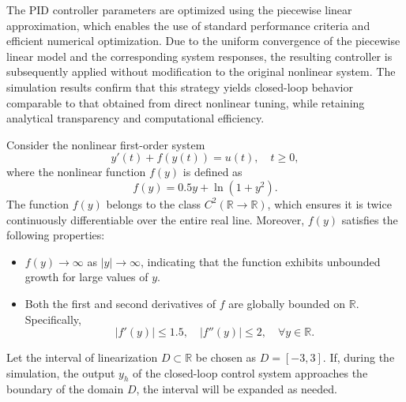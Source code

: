 \documentclass[preprint,12pt]{elsarticle}
\begin{document}
The PID controller parameters are optimized using the piecewise linear approximation, which enables the use of standard performance criteria and efficient numerical optimization. Due to the uniform convergence of the piecewise linear model and the corresponding system responses, the resulting controller is subsequently applied without modification to the original nonlinear system. The simulation results confirm that this strategy yields closed-loop behavior comparable to that obtained from direct nonlinear tuning, while retaining analytical transparency and computational efficiency.

Consider the nonlinear first-order system  
\begin{equation*}
y'(t) + f(y(t)) = u(t), \quad t \geq 0,
\end{equation*}
where the nonlinear function \( f(y) \) is defined as  
\begin{equation*}
f(y) = 0.5y + \ln(1 + y^2).
\end{equation*}
The function \( f(y) \) belongs to the class \( C^2(\mathbb{R} \to \mathbb{R}) \), which ensures it is twice continuously differentiable over the entire real line. Moreover, \( f(y) \) satisfies the following properties:
\begin{itemize}
    \item \( f(y) \to \infty \) as \( |y| \to \infty \), indicating that the function exhibits unbounded growth for large values of \( y \).
    \item Both the first and second derivatives of \( f \) are globally bounded on \( \mathbb{R} \). Specifically,
    \[
    |f'(y)| \leq 1.5, \quad |f''(y)| \leq 2, \quad \forall y \in \mathbb{R}.
    \]
\end{itemize}
Let the interval of linearization \( D \subset \mathbb{R} \) be chosen as \( D = [-3, 3] \).  
If, during the simulation, the output \( y_h \) of the closed-loop control system approaches the boundary of the domain \( D \), the interval will be expanded as needed.
\end{document}

